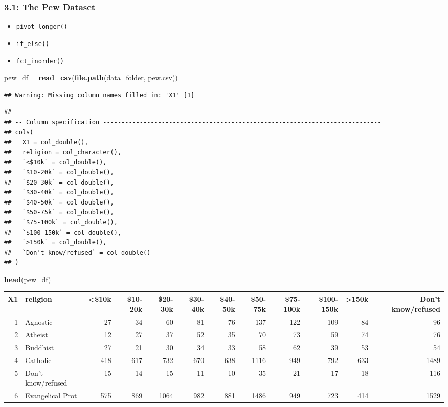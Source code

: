 \documentclass[
]{article}
\newenvironment{Shaded}{\begin{snugshade}}{\end{snugshade}}
\newcommand{\KeywordTok}[1]{\textcolor[rgb]{0.13,0.29,0.53}{\textbf{#1}}}
\newcommand{\NormalTok}[1]{#1}
\newcommand{\StringTok}[1]{\textcolor[rgb]{0.31,0.60,0.02}{#1}}
\providecommand{\tightlist}{%
  \setlength{\itemsep}{0pt}\setlength{\parskip}{0pt}}
\begin{document}
\hypertarget{the-pew-dataset}{%
\subsubsection{3.1: The Pew Dataset}\label{the-pew-dataset}}

\begin{itemize}
\tightlist
\item
  \texttt{pivot\_longer()}
\item
  \texttt{if\_else()}
\item
  \texttt{fct\_inorder()}
\end{itemize}

\begin{Shaded}
\begin{Highlighting}[]
\NormalTok{pew\_df =}\StringTok{ }\KeywordTok{read\_csv}\NormalTok{(}\KeywordTok{file.path}\NormalTok{(data\_folder, }\StringTok{\textquotesingle{}pew.csv\textquotesingle{}}\NormalTok{))}
\end{Highlighting}
\end{Shaded}

\begin{verbatim}
## Warning: Missing column names filled in: 'X1' [1]
\end{verbatim}

\begin{verbatim}
## 
## -- Column specification ----------------------------------------------------------------------------
## cols(
##   X1 = col_double(),
##   religion = col_character(),
##   `<$10k` = col_double(),
##   `$10-20k` = col_double(),
##   `$20-30k` = col_double(),
##   `$30-40k` = col_double(),
##   `$40-50k` = col_double(),
##   `$50-75k` = col_double(),
##   `$75-100k` = col_double(),
##   `$100-150k` = col_double(),
##   `>150k` = col_double(),
##   `Don't know/refused` = col_double()
## )
\end{verbatim}

\begin{Shaded}
\begin{Highlighting}[]
\KeywordTok{head}\NormalTok{(pew\_df)}
\end{Highlighting}
\end{Shaded}

\begin{tabular}{r|l|r|r|r|r|r|r|r|r|r|r}
\hline
X1 & religion & <\$10k & \$10-20k & \$20-30k & \$30-40k & \$40-50k & \$50-75k & \$75-100k & \$100-150k & >150k & Don't know/refused\\
\hline
1 & Agnostic & 27 & 34 & 60 & 81 & 76 & 137 & 122 & 109 & 84 & 96\\
\hline
2 & Atheist & 12 & 27 & 37 & 52 & 35 & 70 & 73 & 59 & 74 & 76\\
\hline
3 & Buddhist & 27 & 21 & 30 & 34 & 33 & 58 & 62 & 39 & 53 & 54\\
\hline
4 & Catholic & 418 & 617 & 732 & 670 & 638 & 1116 & 949 & 792 & 633 & 1489\\
\hline
5 & Don’t know/refused & 15 & 14 & 15 & 11 & 10 & 35 & 21 & 17 & 18 & 116\\
\hline
6 & Evangelical Prot & 575 & 869 & 1064 & 982 & 881 & 1486 & 949 & 723 & 414 & 1529\\
\hline
\end{tabular}
\end{document}
